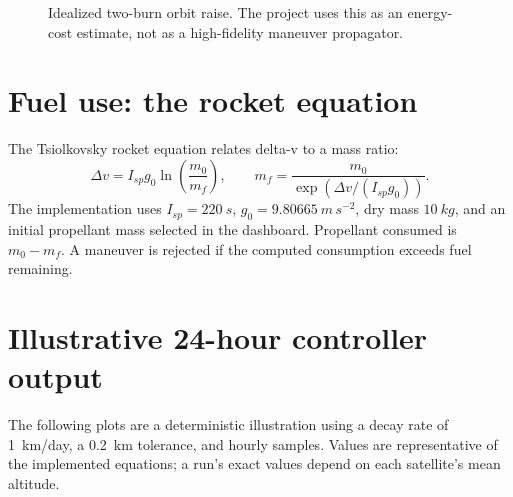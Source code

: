\documentclass[11pt,a4paper]{article}
\begin{document}
\begin{figure}[h]
\centering
{}
\caption{Idealized two-burn orbit raise. The project uses this as an energy-cost estimate, not as a high-fidelity maneuver propagator.}
\end{figure}

\section{Fuel use: the rocket equation}
The Tsiolkovsky rocket equation relates delta-v to a mass ratio:
\begin{equation}
 \Delta v=I_{sp}g_0\ln\left(\frac{m_0}{m_f}\right), \qquad
 m_f=\frac{m_0}{\exp\left(\Delta v/(I_{sp}g_0)\right)}.
\end{equation}
The implementation uses $I_{sp}=\SI{220}{s}$, $g_0=\SI{9.80665}{m\,s^{-2}}$, dry mass $\SI{10}{kg}$, and an initial propellant mass selected in the dashboard. Propellant consumed is $m_0-m_f$. A maneuver is rejected if the computed consumption exceeds fuel remaining.

\section{Illustrative 24-hour controller output}
The following plots are a deterministic illustration using a decay rate of \SI{1}{km/day}, a \SI{0.2}{km} tolerance, and hourly samples. Values are representative of the implemented equations; a run's exact values depend on each satellite's mean altitude.
\end{document}
